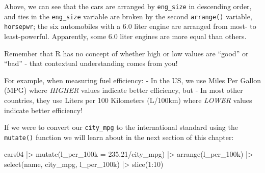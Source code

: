 \documentclass[
  letterpaper,
]{book}
\newenvironment{Shaded}{\begin{snugshade}}{\end{snugshade}}
\newcommand{\AttributeTok}[1]{\textcolor[rgb]{0.40,0.45,0.13}{#1}}
\newcommand{\DecValTok}[1]{\textcolor[rgb]{0.68,0.00,0.00}{#1}}
\newcommand{\FloatTok}[1]{\textcolor[rgb]{0.68,0.00,0.00}{#1}}
\newcommand{\FunctionTok}[1]{\textcolor[rgb]{0.28,0.35,0.67}{#1}}
\newcommand{\NormalTok}[1]{\textcolor[rgb]{0.00,0.23,0.31}{#1}}
\newcommand{\SpecialCharTok}[1]{\textcolor[rgb]{0.37,0.37,0.37}{#1}}
\begin{document}
Above, we can see that the cars are arranged by \texttt{eng\_size} in
descending order, and ties in the \texttt{eng\_size} variable are broken
by the second \texttt{arrange()} variable, \texttt{horsepwr}; the six
automobiles with a 6.0 liter engine are arranged from most- to
least-powerful. Apparently, some 6.0 liter engines are more equal than
others.

\begin{tcolorbox}[enhanced jigsaw, colframe=quarto-callout-tip-color-frame, breakable, arc=.35mm, bottomtitle=1mm, bottomrule=.15mm, colbacktitle=quarto-callout-tip-color!10!white, rightrule=.15mm, colback=white, opacityback=0, opacitybacktitle=0.6, coltitle=black, left=2mm, toptitle=1mm, toprule=.15mm, titlerule=0mm, leftrule=.75mm, title=\textcolor{quarto-callout-tip-color}{\faLightbulb}\hspace{0.5em}{Data Storytelling: R Crunches Numbers, You Analyze Data}]

Remember that R has no concept of whether high or low values are
``good'' or ``bad'' - that contextual understanding comes from you!

For example, when measuring fuel efficiency: - In the US, we use Miles
Per Gallon (MPG) where \emph{HIGHER} values indicate better efficiency,
but - In most other countries, they use Liters per 100 Kilometers
(L/100km) where \emph{LOWER} values indicate better efficiency!

If we were to convert our \texttt{city\_mpg} to the international
standard using the \texttt{mutate()} function we will learn about in the
next section of this chapter:

\begin{Shaded}
\begin{Highlighting}[]
\NormalTok{cars04 }\SpecialCharTok{|\textgreater{}} 
  \FunctionTok{mutate}\NormalTok{(}\AttributeTok{l\_per\_100k =} \FloatTok{235.21}\SpecialCharTok{/}\NormalTok{city\_mpg) }\SpecialCharTok{|\textgreater{}} 
  \FunctionTok{arrange}\NormalTok{(l\_per\_100k) }\SpecialCharTok{|\textgreater{}} 
  \FunctionTok{select}\NormalTok{(name, city\_mpg, l\_per\_100k) }\SpecialCharTok{|\textgreater{}} 
  \FunctionTok{slice}\NormalTok{(}\DecValTok{1}\SpecialCharTok{:}\DecValTok{10}\NormalTok{)}
\end{Highlighting}
\end{Shaded}


\end{tcolorbox}
\end{document}
